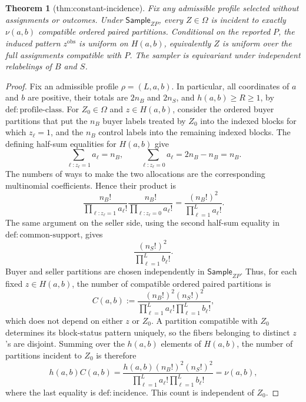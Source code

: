 \documentclass{article}
\newtheorem{theorem}{Theorem}
\begin{document}
\begin{theorem}[thm:constant-incidence]\label{thm:constant-incidence}
Fix any admissible profile selected without assignments or outcomes. Under \(\mathsf{Sample}_{ZP}\), every \(Z\in\Omega\) is incident to exactly \(\nu(a,b)\) compatible ordered paired partitions. Conditional on the reported \(P\), the induced pattern \(z^{\mathrm{obs}}\) is uniform on \(H(a,b)\), equivalently \(Z\) is uniform over the full assignments compatible with \(P\). The sampler is equivariant under independent relabelings of \(B\) and \(S\).
\end{theorem}
\begin{proof}
Fix an admissible profile \(\rho=(L,a,b)\).  In particular, all coordinates of \(a\) and \(b\) are positive, their totals are \(2n_B\) and \(2n_S\), and \(h(a,b)\ge R\ge1\), by \(\mathrm{def{:}profile\mbox{-}class}\).  For \(Z_0\in\Omega\) and \(z\in H(a,b)\), consider the ordered buyer partitions that put the \(n_B\) buyer labels treated by \(Z_0\) into the indexed blocks for which \(z_\ell=1\), and the \(n_B\) control labels into the remaining indexed blocks.  The defining half-sum equalities for \(H(a,b)\) give
\[
 \sum_{\ell:z_\ell=1}a_\ell=n_B,
 \qquad
 \sum_{\ell:z_\ell=0}a_\ell
 =2n_B-n_B=n_B.
\]
The numbers of ways to make the two allocations are the corresponding multinomial coefficients.  Hence their product is
\[
 \frac{n_B!}{\prod_{\ell:z_\ell=1}a_\ell!}
 \frac{n_B!}{\prod_{\ell:z_\ell=0}a_\ell!}
 =\frac{(n_B!)^2}{\prod_{\ell=1}^{L}a_\ell!}.
\]
The same argument on the seller side, using the second half-sum equality in \(\mathrm{def{:}common\mbox{-}support}\), gives
\[
 \frac{(n_S!)^2}{\prod_{\ell=1}^{L}b_\ell!}.
\]
Buyer and seller partitions are chosen independently in \(\mathsf{Sample}_{ZP}\).  Thus, for each fixed \(z\in H(a,b)\), the number of compatible ordered paired partitions is
\[
 C(a,b):=
 \frac{(n_B!)^2(n_S!)^2}
 {\prod_{\ell=1}^{L}a_\ell!\prod_{\ell=1}^{L}b_\ell!},
\]
which does not depend on either \(z\) or \(Z_0\).  A partition compatible with \(Z_0\) determines its block-status pattern uniquely, so the fibers belonging to distinct \(z\)'s are disjoint.  Summing over the \(h(a,b)\) elements of \(H(a,b)\), the number of partitions incident to \(Z_0\) is therefore
\[
 h(a,b)C(a,b)
 =\frac{h(a,b)(n_B!)^2(n_S!)^2}
 {\prod_{\ell=1}^{L}a_\ell!\prod_{\ell=1}^{L}b_\ell!}
 =\nu(a,b),
\]
where the last equality is \(\mathrm{def{:}incidence}\).  This count is independent of \(Z_0\).


\end{proof}
\end{document}
